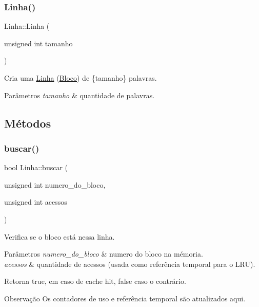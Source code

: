 \subsubsection{\texorpdfstring{Linha()}{Linha()}}
{\footnotesize\ttfamily Linha\+::\+Linha (\begin{DoxyParamCaption}\item[{unsigned int}]{tamanho }\end{DoxyParamCaption})\hspace{0.3cm}{\ttfamily [inline]}}



Cria uma \hyperlink{structLinha}{Linha} (\hyperlink{structBloco}{Bloco}) de \{tamanho\} palavras. 


\begin{DoxyParams}{Parâmetros}
{\em tamanho} & quantidade de palavras. \\
\hline
\end{DoxyParams}


\subsection{Métodos}
\mbox{\label{structLinha_a7c1d9293e17a1919e53dc35df4c2e5c3}} 
\subsubsection{\texorpdfstring{buscar()}{buscar()}}
{\footnotesize\ttfamily bool Linha\+::buscar (\begin{DoxyParamCaption}\item[{unsigned int}]{numero\+\_\+do\+\_\+bloco,  }\item[{unsigned int}]{acessos }\end{DoxyParamCaption})\hspace{0.3cm}{\ttfamily [inline]}}



Verifica se o bloco está nessa linha. 


\begin{DoxyParams}{Parâmetros}
{\em numero\+\_\+do\+\_\+bloco} & numero do bloco na mémoria. \\
\hline
{\em acessos} & quantidade de acessos (usada como referência temporal para o L\+RU). \\
\hline
\end{DoxyParams}
\begin{DoxyReturn}{Retorna}
true, em caso de cache hit, false caso o contrário. 
\end{DoxyReturn}
\begin{DoxyNote}{Observação}
Os contadores de uso e referência temporal são atualizados aqui. 
\end{DoxyNote}
\mbox{\label{structLinha_aa7aa98581c6cd16951abb275fe78727d}} 
